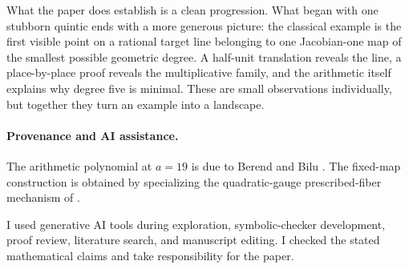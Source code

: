 What the paper does establish is a clean progression.  What began with one
stubborn quintic ends with a more generous picture: the classical example is
the first visible point on a rational target line belonging to one
Jacobian-one map of the smallest possible geometric degree.  A half-unit
translation reveals the line, a place-by-place proof reveals the
multiplicative family, and the arithmetic itself explains why degree five is
minimal.  These are small observations individually, but together they turn
an example into a landscape.

\paragraph{Provenance and AI assistance.}
The arithmetic polynomial at \(a=19\) is due to Berend and Bilu
\cite{BerendBilu}.  The fixed-map construction is obtained by specializing
the quadratic-gauge prescribed-fiber mechanism of \cite{vanRijnFibers}.

I used generative AI tools during exploration, symbolic-checker development,
proof review, literature search, and manuscript editing.  I checked the
stated mathematical claims and take responsibility for the paper.

